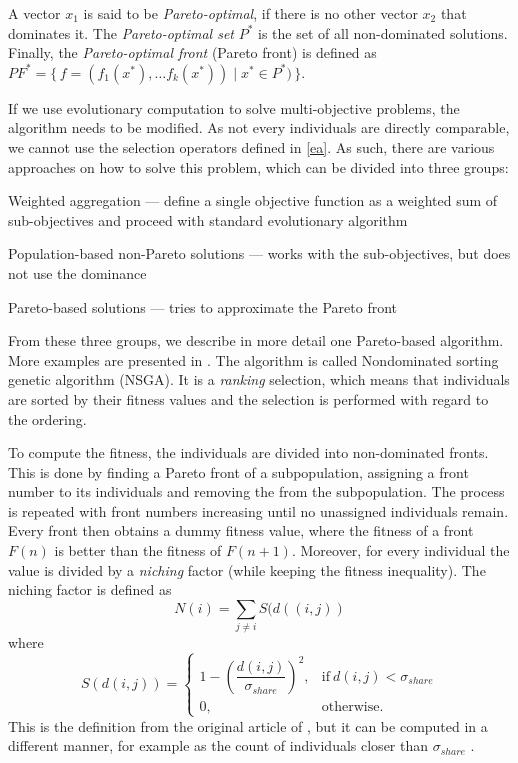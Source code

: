 \begin{definition}
A vector $x_1$ is said to be \emph{Pareto-optimal}, if there is no other vector
$x_2$ that dominates it. The \emph{Pareto-optimal set} $P^*$ is the set of all
non-dominated solutions. Finally, the \emph{Pareto-optimal front} (Pareto front)
is defined as
$PF^* =\{\, f=(f_1(x^*),\ldots f_k(x^*)) \mid x^* \in P^* ) \,\}$. 
\end{definition}

If we use evolutionary computation to solve multi-objective problems, the
algorithm needs to be modified. As not every individuals are directly
comparable, we cannot use the selection operators defined in
\ref{ea}. As such, there are various approaches on how to solve this problem,
which can be divided into three groups:

\begin{compactitem}
\item Weighted aggregation --- define a single objective function as a weighted
sum of sub-objectives and proceed with standard evolutionary algorithm
\item Population-based non-Pareto solutions --- works with the sub-objectives,
but does not use the dominance
\item Pareto-based solutions --- tries to approximate the Pareto front
\end{compactitem}

From these three groups, we describe in more detail one Pareto-based algorithm.
More examples are presented in 
\cite[p.~170-173]{Engelbrecht:2007:CII:1557464}.
The algorithm is called Nondominated sorting genetic algorithm (NSGA). It is a
\emph{ranking} selection, which means that individuals are sorted by their
fitness values and the selection is performed with regard to the ordering.

To compute the fitness, the individuals are divided into non-dominated fronts.
This is done by finding a Pareto front of a subpopulation, assigning a
front number to its individuals and removing the from the subpopulation.
The process is repeated with front numbers increasing until no unassigned
individuals remain. Every front then obtains a dummy fitness value, where
the fitness of a front $F(n)$ is better than the fitness of $F(n+1)$. Moreover,
for every individual the value is divided by a \emph{niching} factor (while
keeping the fitness inequality). The 
niching factor is defined as
$$N(i)=\sum_{j\neq i}{S(d((i,j))}$$ where 
\begin{equation}
    S(d(i,j))=
    \begin{cases}
      1 - (\dfrac{d(i,j)}{\sigma_{share}})^2, & \text{if}\ d(i,j) < \sigma_{share} \\
      0, & \text{otherwise.}
    \end{cases}
\end{equation}
This is the definition from the original article of
\cite{Srinivas:1994:MOU:1326668.1326671}, but it can be computed in a different
manner, for example as the count of individuals closer than $\sigma_{share}$
\citep{Engelbrecht:2007:CII:1557464}.

